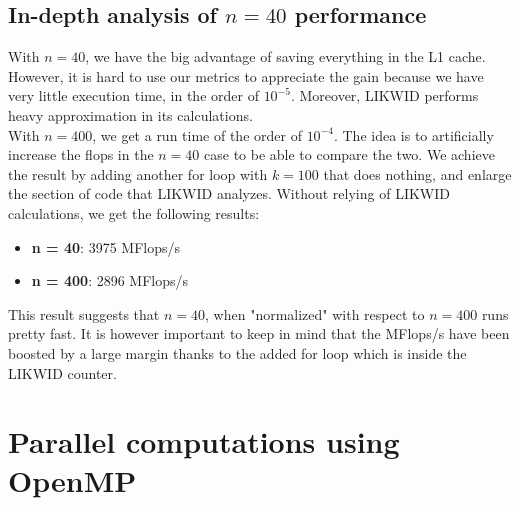 \documentclass[11pt,a4paper,oneside,titlepage,openright]{book}
\begin{document}
\section{In-depth analysis of $n = 40$ performance}

With $ n = 40$, we have the big advantage of saving everything in the L1 cache. However, it is hard to use our metrics to appreciate the gain because we have very little execution time, in the order of $10^{-5}$. Moreover, LIKWID performs heavy approximation in its calculations. \\
With $n= 400$, we get a run time of the order of $10^{-4}$. 
The idea is to artificially increase the flops in the $n=40$ case to be able to compare the two. We achieve the result by adding another for loop with $k=100$ that does nothing, and enlarge the section of code that LIKWID analyzes. 
Without relying of LIKWID calculations, we get the following results: 
\begin{itemize}
\item \textbf{ n = 40}: 3975 MFlops/s
\item \textbf{ n = 400}: 2896 MFlops/s
\end{itemize}
This result suggests that $n = 40$, when "normalized" with respect to $n = 400$ runs pretty fast. It is however important to keep in mind that the MFlops/s have been boosted by a large margin thanks to the added for loop which is inside the LIKWID counter.


\chapter{Parallel computations using OpenMP}
\end{document}
